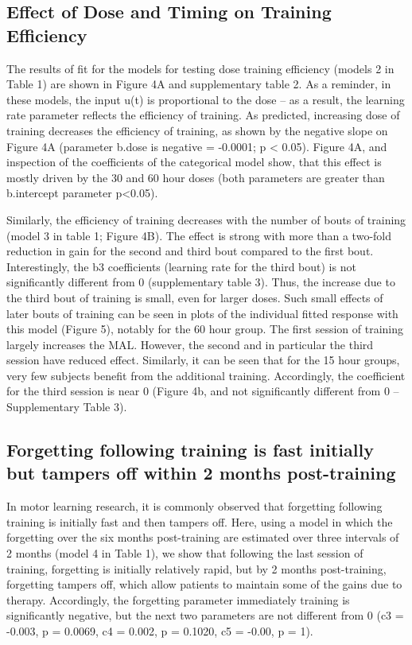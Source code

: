 \subsection{Effect of Dose and Timing on Training Efficiency}
The results of fit for the models for testing dose training efficiency (models 2 in Table 1) are shown in Figure 4A and supplementary table 2. 
As a reminder, in these models, the input u(t) is proportional to the dose – as a result, the learning rate parameter reflects the efficiency of training. 
As predicted, increasing dose of training decreases the efficiency of training, as shown by the negative slope on Figure 4A (parameter b.dose is negative  = -0.0001; p < 0.05). 
Figure 4A, and inspection of the coefficients of the categorical model show, that this effect is mostly driven by the 30 and 60 hour doses (both parameters are greater than b.intercept parameter p<0.05).

Similarly, the efficiency of training decreases with the number of bouts of training (model 3 in table 1; Figure 4B). 
The effect is strong with more than a two-fold reduction in gain for the second and third bout compared to the first bout. 
Interestingly, the b3 coefficients (learning rate for the third bout) is not significantly different from 0 (supplementary table 3). 
Thus, the increase due to the third bout of training is small, even for larger doses. 
Such small effects of later bouts of training can be seen in plots of the individual fitted response with this model (Figure 5), notably for the 60 hour group. 
The first session of training largely increases the MAL. 
However, the second and in particular the third session have reduced effect. 
Similarly, it can be seen that for the 15 hour groups, very few subjects benefit from the additional training. 
Accordingly, the coefficient for the third session is near 0 (Figure 4b, and not significantly different from 0 – Supplementary Table 3).

\subsection{Forgetting following training is fast initially but tampers off within 2 months post-training}
In motor learning research, it is commonly observed that forgetting following training is initially fast and then tampers off. 
Here, using a model in which the forgetting over the six months post-training are estimated over three intervals of 2 months (model 4 in Table 1), we show that following the last session of training, forgetting is initially relatively rapid, but by 2 months post-training, forgetting tampers off, which allow patients to maintain some of the gains due to therapy. 
Accordingly, the forgetting parameter immediately training is significantly negative, but the next two parameters are not different from 0 (c3 = -0.003, p = 0.0069, c4 = 0.002, p = 0.1020, c5 = -0.00, p = 1).

